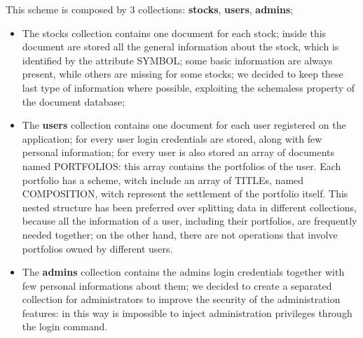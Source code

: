 This scheme is composed by 3 collections: \textbf{stocks}, \textbf{users}, \textbf{admins};
\begin{itemize}
    \item
The stocks collection contains one document for each stock; inside this document are stored 
all the general information about the stock, which is identified by the attribute SYMBOL;
some basic information are always present, while others are missing for some stocks; we decided 
to keep these last type of information where possible, exploiting the schemaless property of
the document database;
    \item
The \textbf{users} collection contains one document for each user registered on the application; for every
user login credentials are stored, along with few personal information; for every user is 
also stored an array of documents named PORTFOLIOS: this array contains the portfolios of the user.
Each portfolio has a scheme, witch include an array of TITLEs, named COMPOSITION, witch represent
the settlement of the portfolio itself. This nested structure has been preferred over splitting
data in different collections, because all the information of a user, including their portfolios, 
are frequently needed together; on the other hand, there are not operations that involve
portfolios owned by different users.
    \item 
The \textbf{admins} collection contains the admins login credentials together with few personal
informations about them; we decided to create a separated collection for administrators 
to improve the security of the administration features: in this way is impossible to inject
administration privileges through the login command.
\end{itemize}

